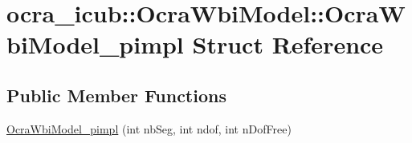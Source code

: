 \hypertarget{structOcraWbiModel_1_1OcraWbiModel__pimpl}{}\section{ocra\+\_\+icub\+:\+:Ocra\+Wbi\+Model\+:\+:Ocra\+Wbi\+Model\+\_\+pimpl Struct Reference}
\label{structOcraWbiModel_1_1OcraWbiModel__pimpl}
\subsection*{Public Member Functions}
\begin{DoxyCompactItemize}
\item 
\hyperlink{structOcraWbiModel_1_1OcraWbiModel__pimpl_a160077c75e80a7d0fcc8b2491de7f86c}{Ocra\+Wbi\+Model\+\_\+pimpl} (int nb\+Seg, int ndof, int n\+Dof\+Free)
\end{DoxyCompactItemize}
